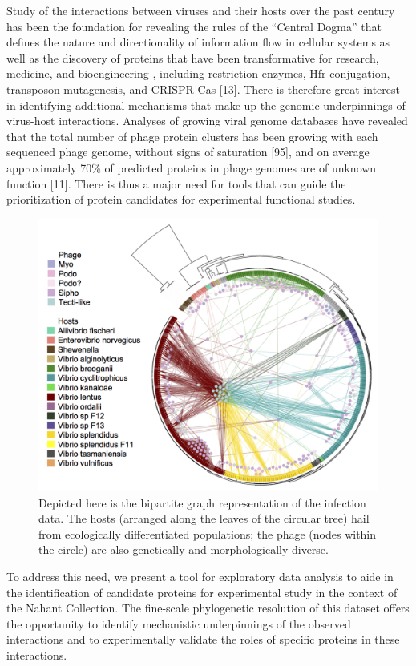 \documentclass[12pt,twoside]{mitthesis-manusdown}
\begin{document}
Study of the interactions between viruses and their hosts over the past
century has been the foundation for revealing the rules of the ``Central
Dogma'' that defines the nature and directionality of information flow
in cellular systems as well as the discovery of proteins that have been
transformative for research, medicine, and bioengineering , including
restriction enzymes, Hfr conjugation, transposon mutagenesis, and
CRISPR-Cas {[}13{]}. There is therefore great interest in identifying
additional mechanisms that make up the genomic underpinnings of
virus-host interactions. Analyses of growing viral genome databases have
revealed that the total number of phage protein clusters has been
growing with each sequenced phage genome, without signs of saturation
{[}95{]}, and on average approximately 70\% of predicted proteins in
phage genomes are of unknown function {[}11{]}. There is thus a major
need for tools that can guide the prioritization of protein candidates
for experimental functional studies.
\begin{figure}[tb!]

{\centering \includegraphics[width=0.8\linewidth]{figuresviz/bipartiteGraph} 

}

\caption{\label{fig:bipartite}Depicted here is the bipartite graph representation of the infection data. The hosts (arranged along the leaves of the circular tree) hail from ecologically differentiated populations; the phage (nodes within the circle) are also genetically and morphologically diverse.}\label{fig:bipartite}
\end{figure}
To address this need, we present a tool for exploratory data analysis to
aide in the identification of candidate proteins for experimental study
in the context of the Nahant Collection. The fine-scale phylogenetic
resolution of this dataset offers the opportunity to identify
mechanistic underpinnings of the observed interactions and to
experimentally validate the roles of specific proteins in these
interactions.
\end{document}

